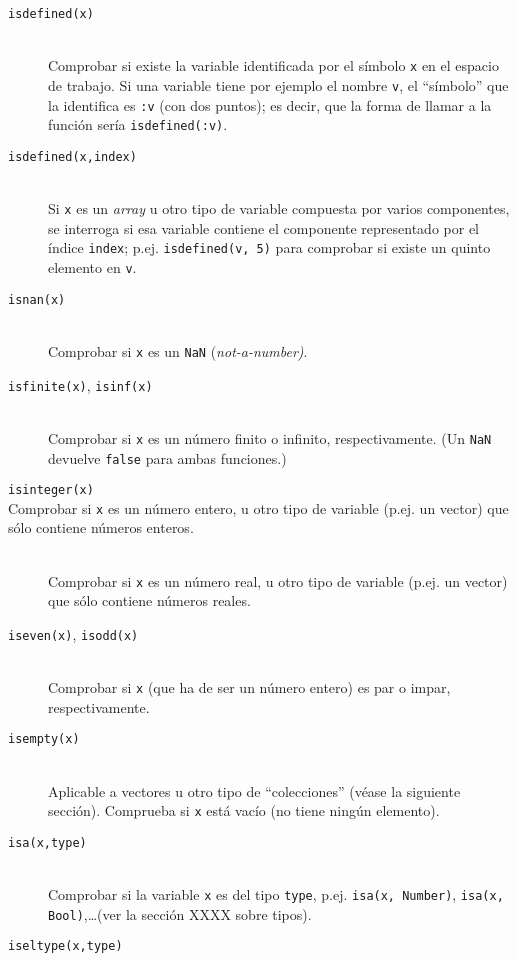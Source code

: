 ﻿\documentclass{article}
\newcommand{\code}{\texttt}
\begin{document}
\begin{description}
  \item[\code{isdefined(x)}] \hfill \\
  Comprobar si existe la variable identificada por el símbolo \code{x} en el espacio de trabajo. Si una variable tiene por ejemplo el nombre \code{v}, el ``símbolo'' que la identifica es \code{:v} (con dos puntos); es decir, que la forma de llamar a la función sería \code{isdefined(:v)}.
  \item[\code{isdefined(x,index)}] \hfill \\
  Si \code{x} es un \emph{array} u otro tipo de variable compuesta por varios componentes, se interroga si esa variable contiene el componente representado por el índice \code{index}; p.ej. \code{isdefined(v, 5)} para comprobar si existe un quinto elemento en \code{v}.
  \item[\code{isnan(x)}] \hfill \\
  Comprobar si \code{x} es un \code{NaN} (\emph{not-a-number)}.
  \item[\code{isfinite(x)}, \code{isinf(x)}] \hfill \\
  Comprobar si \code{x} es un número finito o infinito, respectivamente. (Un \code{NaN} devuelve \code{false} para ambas funciones.)
  \item[\code{isinteger(x)} \hfill \\
  Comprobar si \code{x} es un número entero, u otro tipo de variable (p.ej. un vector) que sólo contiene números enteros.
  \item[\code{isreal(x)}] \hfill \\
  Comprobar si \code{x} es un número real, u otro tipo de variable (p.ej. un vector) que sólo contiene números reales.
  \item[\code{iseven(x)}, \code{isodd(x)}] \hfill \\
  Comprobar si \code{x} (que ha de ser un número entero) es par o impar, respectivamente.
  \item[\code{isempty(x)}] \hfill \\
  Aplicable a vectores u otro tipo de ``colecciones'' (véase la siguiente sección). Comprueba si \code{x} está vacío (no tiene ningún elemento).
  \item[\code{isa(x,type)}] \hfill \\
  Comprobar si la variable \code{x} es del tipo \code{type}, p.ej. \code{isa(x, Number)}, \code{isa(x, Bool)},\ldots (ver la sección XXXX sobre tipos).
  \item[\code{iseltype(x,type)}] \hfill \\

\end{description}
\end{document}
